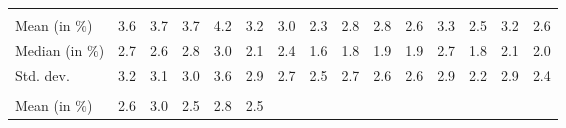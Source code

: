 \begin{tabular}{lllllllllllllll}
  \multicolumn{1}{r}{} &
  \multicolumn{1}{r}{} &
  \multicolumn{1}{r}{} &
  \multicolumn{1}{r}{} &
  \multicolumn{1}{r}{} &
  \multicolumn{1}{r}{} &
  \multicolumn{1}{r}{} &
  \multicolumn{1}{r}{} &
  \multicolumn{1}{r}{} &
  \multicolumn{1}{r}{} \\
\multicolumn{1}{l}{\hspace{2em}Mean (in $\%$)} &
  \multicolumn{1}{|r}{3.6} &
  \multicolumn{1}{r}{3.7} &
  \multicolumn{1}{r}{3.7} &
  \multicolumn{1}{r}{4.2} &
  \multicolumn{1}{r}{3.2} &
  \multicolumn{1}{r}{3.0} &
  \multicolumn{1}{r}{2.3} &
  \multicolumn{1}{r}{2.8} &
  \multicolumn{1}{r}{2.8} &
  \multicolumn{1}{r}{2.6} &
  \multicolumn{1}{r}{3.3} &
  \multicolumn{1}{r}{2.5} &
  \multicolumn{1}{r}{3.2} &
  \multicolumn{1}{r}{2.6} \\
\multicolumn{1}{l}{\hspace{2em}Median (in $\%$)} &
  \multicolumn{1}{|r}{2.7} &
  \multicolumn{1}{r}{2.6} &
  \multicolumn{1}{r}{2.8} &
  \multicolumn{1}{r}{3.0} &
  \multicolumn{1}{r}{2.1} &
  \multicolumn{1}{r}{2.4} &
  \multicolumn{1}{r}{1.6} &
  \multicolumn{1}{r}{1.8} &
  \multicolumn{1}{r}{1.9} &
  \multicolumn{1}{r}{1.9} &
  \multicolumn{1}{r}{2.7} &
  \multicolumn{1}{r}{1.8} &
  \multicolumn{1}{r}{2.1} &
  \multicolumn{1}{r}{2.0} \\
\multicolumn{1}{l}{\hspace{2em}Std. dev.} &
  \multicolumn{1}{|r}{3.2} &
  \multicolumn{1}{r}{3.1} &
  \multicolumn{1}{r}{3.0} &
  \multicolumn{1}{r}{3.6} &
  \multicolumn{1}{r}{2.9} &
  \multicolumn{1}{r}{2.7} &
  \multicolumn{1}{r}{2.5} &
  \multicolumn{1}{r}{2.7} &
  \multicolumn{1}{r}{2.6} &
  \multicolumn{1}{r}{2.6} &
  \multicolumn{1}{r}{2.9} &
  \multicolumn{1}{r}{2.2} &
  \multicolumn{1}{r}{2.9} &
  \multicolumn{1}{r}{2.4} \\
\multicolumn{1}{l}{\hspace{1em}{\textit{Additive term} ($\widehat{t}/\widetilde{p}$)}} &
  \multicolumn{1}{|r}{} &
  \multicolumn{1}{r}{} &
  \multicolumn{1}{r}{} &
  \multicolumn{1}{r}{} &
  \multicolumn{1}{r}{} &
  \multicolumn{1}{r}{} &
  \multicolumn{1}{r}{} &
  \multicolumn{1}{r}{} &
  \multicolumn{1}{r}{} &
  \multicolumn{1}{r}{} &
  \multicolumn{1}{r}{} &
  \multicolumn{1}{r}{} &
  \multicolumn{1}{r}{} &
  \multicolumn{1}{r}{} \\
\multicolumn{1}{l}{\hspace{2em}Mean (in $\%$)} &
  \multicolumn{1}{|r}{2.6} &
  \multicolumn{1}{r}{3.0} &
  \multicolumn{1}{r}{2.5} &
  \multicolumn{1}{r}{2.8} &
  \multicolumn{1}{r}{2.5} &

\end{tabular}
